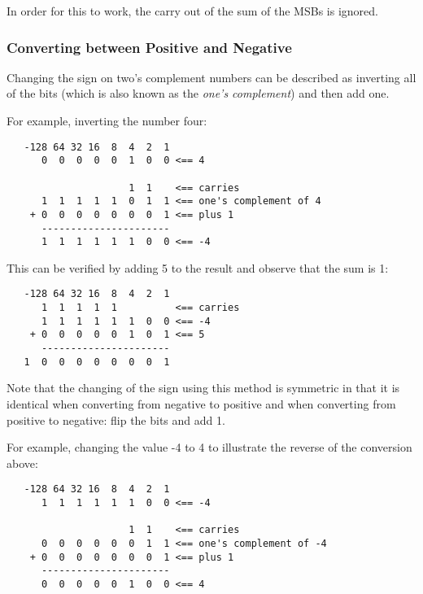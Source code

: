 In order for this to work, the carry out of the sum of the MSBs is 
ignored.

\subsubsection{Converting between Positive and Negative}

Changing the sign on two's complement numbers can be described as
inverting all of the bits (which is also known as the {\em one's complement})
and then add one.

For example, inverting the number four:

\begin{verbatim}
   -128 64 32 16  8  4  2  1
      0  0  0  0  0  1  0  0 <== 4

                     1  1    <== carries
      1  1  1  1  1  0  1  1 <== one's complement of 4
    + 0  0  0  0  0  0  0  1 <== plus 1
      ----------------------
      1  1  1  1  1  1  0  0 <== -4
\end{verbatim}

This can be verified by adding 5 to the result and observe that
the sum is 1:

\begin{verbatim}
   -128 64 32 16  8  4  2  1
      1  1  1  1  1          <== carries
      1  1  1  1  1  1  0  0 <== -4
    + 0  0  0  0  0  1  0  1 <== 5
      ----------------------
   1  0  0  0  0  0  0  0  1
\end{verbatim}

Note that the changing of the sign using this method is symmetric
in that it is identical when converting from negative to positive
and when converting from positive to negative: flip the bits and
add 1.

For example, changing the value -4 to 4 to illustrate the
reverse of the conversion above:

\begin{verbatim}
   -128 64 32 16  8  4  2  1
      1  1  1  1  1  1  0  0 <== -4

                     1  1    <== carries
      0  0  0  0  0  0  1  1 <== one's complement of -4
    + 0  0  0  0  0  0  0  1 <== plus 1
      ----------------------
      0  0  0  0  0  1  0  0 <== 4
\end{verbatim}

